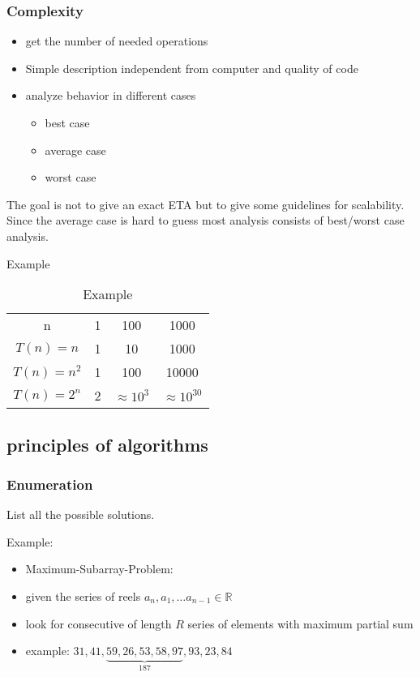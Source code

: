\documentclass[a4paper]{article}
\begin{document}
\subsubsection{Complexity}
\begin{itemize}
    \item get the number of needed operations
    \item Simple description independent from computer and quality of code
    \item analyze behavior in different cases
        \begin{itemize}
            \item best case
            \item average case
            \item worst case
        \end{itemize}
\end{itemize}
The goal is not to give an exact ETA but to give some guidelines for scalability.
Since the average case is hard to guess most analysis consists of best/worst case analysis.

Example

\begin{table}[htpb]
    \centering
    \caption{Example}
    \label{tab:label}
    \begin{tabular}{cccc}
        n & 1 & 100 & 1000 \\
        $ T(n)=n $ & 1 & 10 & 1000 \\
        $ T(n)=n^2 $ & 1 & 100 & 10000 \\
        $ T(n)=2^n $ & 2 & $ \approx  10^3 $ & $ \approx  10^{30} $
    \end{tabular}
\end{table}

\subsection{principles of algorithms}
\subsubsection{Enumeration}
List all the possible solutions.

Example:
\begin{itemize}
    \item Maximum-Subarray-Problem:
    \item given the series of reels $ a _{n}, a _{1}, \dots a _{n-1} \in \mathbb{R}  $
    \item look for consecutive of length $ R $ series of elements with maximum partial sum
    \item example: $ 31, 41, \underbrace{59, 26, 53, 58, 97}_{187} , 93, 23, 84 $
\end{itemize}
\end{document}
